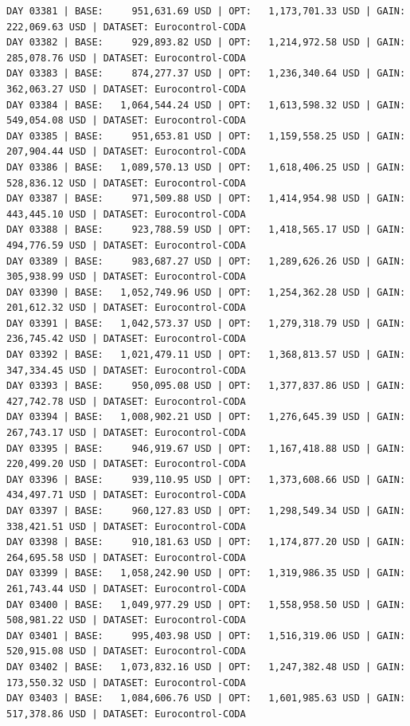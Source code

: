 \documentclass[11pt,a4paper]{article}
\begin{document}
\begin{verbatim}
DAY 03381 | BASE:     951,631.69 USD | OPT:   1,173,701.33 USD | GAIN: 222,069.63 USD | DATASET: Eurocontrol-CODA
DAY 03382 | BASE:     929,893.82 USD | OPT:   1,214,972.58 USD | GAIN: 285,078.76 USD | DATASET: Eurocontrol-CODA
DAY 03383 | BASE:     874,277.37 USD | OPT:   1,236,340.64 USD | GAIN: 362,063.27 USD | DATASET: Eurocontrol-CODA
DAY 03384 | BASE:   1,064,544.24 USD | OPT:   1,613,598.32 USD | GAIN: 549,054.08 USD | DATASET: Eurocontrol-CODA
DAY 03385 | BASE:     951,653.81 USD | OPT:   1,159,558.25 USD | GAIN: 207,904.44 USD | DATASET: Eurocontrol-CODA
DAY 03386 | BASE:   1,089,570.13 USD | OPT:   1,618,406.25 USD | GAIN: 528,836.12 USD | DATASET: Eurocontrol-CODA
DAY 03387 | BASE:     971,509.88 USD | OPT:   1,414,954.98 USD | GAIN: 443,445.10 USD | DATASET: Eurocontrol-CODA
DAY 03388 | BASE:     923,788.59 USD | OPT:   1,418,565.17 USD | GAIN: 494,776.59 USD | DATASET: Eurocontrol-CODA
DAY 03389 | BASE:     983,687.27 USD | OPT:   1,289,626.26 USD | GAIN: 305,938.99 USD | DATASET: Eurocontrol-CODA
DAY 03390 | BASE:   1,052,749.96 USD | OPT:   1,254,362.28 USD | GAIN: 201,612.32 USD | DATASET: Eurocontrol-CODA
DAY 03391 | BASE:   1,042,573.37 USD | OPT:   1,279,318.79 USD | GAIN: 236,745.42 USD | DATASET: Eurocontrol-CODA
DAY 03392 | BASE:   1,021,479.11 USD | OPT:   1,368,813.57 USD | GAIN: 347,334.45 USD | DATASET: Eurocontrol-CODA
DAY 03393 | BASE:     950,095.08 USD | OPT:   1,377,837.86 USD | GAIN: 427,742.78 USD | DATASET: Eurocontrol-CODA
DAY 03394 | BASE:   1,008,902.21 USD | OPT:   1,276,645.39 USD | GAIN: 267,743.17 USD | DATASET: Eurocontrol-CODA
DAY 03395 | BASE:     946,919.67 USD | OPT:   1,167,418.88 USD | GAIN: 220,499.20 USD | DATASET: Eurocontrol-CODA
DAY 03396 | BASE:     939,110.95 USD | OPT:   1,373,608.66 USD | GAIN: 434,497.71 USD | DATASET: Eurocontrol-CODA
DAY 03397 | BASE:     960,127.83 USD | OPT:   1,298,549.34 USD | GAIN: 338,421.51 USD | DATASET: Eurocontrol-CODA
DAY 03398 | BASE:     910,181.63 USD | OPT:   1,174,877.20 USD | GAIN: 264,695.58 USD | DATASET: Eurocontrol-CODA
DAY 03399 | BASE:   1,058,242.90 USD | OPT:   1,319,986.35 USD | GAIN: 261,743.44 USD | DATASET: Eurocontrol-CODA
DAY 03400 | BASE:   1,049,977.29 USD | OPT:   1,558,958.50 USD | GAIN: 508,981.22 USD | DATASET: Eurocontrol-CODA
DAY 03401 | BASE:     995,403.98 USD | OPT:   1,516,319.06 USD | GAIN: 520,915.08 USD | DATASET: Eurocontrol-CODA
DAY 03402 | BASE:   1,073,832.16 USD | OPT:   1,247,382.48 USD | GAIN: 173,550.32 USD | DATASET: Eurocontrol-CODA
DAY 03403 | BASE:   1,084,606.76 USD | OPT:   1,601,985.63 USD | GAIN: 517,378.86 USD | DATASET: Eurocontrol-CODA

\end{verbatim}
\end{document}
